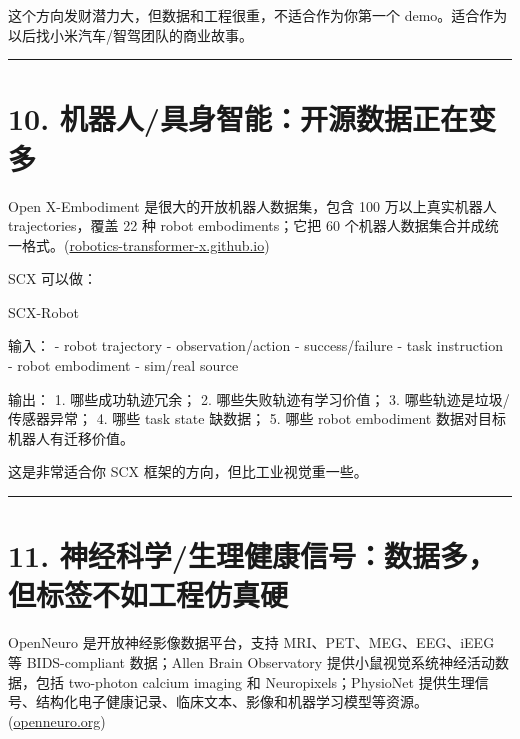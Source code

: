 \documentclass[
  12pt,
]{ctexart}
\newenvironment{Shaded}{}{}
\newcommand{\NormalTok}[1]{#1}
\begin{document}
这个方向发财潜力大，但数据和工程很重，不适合作为你第一个
demo。适合作为以后找小米汽车/智驾团队的商业故事。

\begin{center}\rule{0.5\linewidth}{0.5pt}\end{center}

\section{10.
机器人/具身智能：开源数据正在变多}\label{ux673aux5668ux4ebaux5177ux8eabux667aux80fdux5f00ux6e90ux6570ux636eux6b63ux5728ux53d8ux591a}

Open X-Embodiment 是很大的开放机器人数据集，包含 100 万以上真实机器人
trajectories，覆盖 22 种 robot embodiments；它把 60
个机器人数据集合并成统一格式。(\href{https://robotics-transformer-x.github.io/?utm_source=chatgpt.com}{robotics-transformer-x.github.io})

SCX 可以做：

\begin{Shaded}
\begin{Highlighting}[]
\NormalTok{SCX{-}Robot}

\NormalTok{输入：}
\NormalTok{{-} robot trajectory}
\NormalTok{{-} observation/action}
\NormalTok{{-} success/failure}
\NormalTok{{-} task instruction}
\NormalTok{{-} robot embodiment}
\NormalTok{{-} sim/real source}

\NormalTok{输出：}
\NormalTok{1. 哪些成功轨迹冗余；}
\NormalTok{2. 哪些失败轨迹有学习价值；}
\NormalTok{3. 哪些轨迹是垃圾/传感器异常；}
\NormalTok{4. 哪些 task state 缺数据；}
\NormalTok{5. 哪些 robot embodiment 数据对目标机器人有迁移价值。}
\end{Highlighting}
\end{Shaded}

这是非常适合你 SCX 框架的方向，但比工业视觉重一些。

\begin{center}\rule{0.5\linewidth}{0.5pt}\end{center}

\section{11.
神经科学/生理健康信号：数据多，但标签不如工程仿真硬}\label{ux795eux7ecfux79d1ux5b66ux751fux7406ux5065ux5eb7ux4fe1ux53f7ux6570ux636eux591aux4f46ux6807ux7b7eux4e0dux5982ux5de5ux7a0bux4effux771fux786c}

OpenNeuro 是开放神经影像数据平台，支持 MRI、PET、MEG、EEG、iEEG 等
BIDS-compliant 数据；Allen Brain Observatory
提供小鼠视觉系统神经活动数据，包括 two-photon calcium imaging 和
Neuropixels；PhysioNet
提供生理信号、结构化电子健康记录、临床文本、影像和机器学习模型等资源。(\href{https://openneuro.org/?utm_source=chatgpt.com}{openneuro.org})
\end{document}
